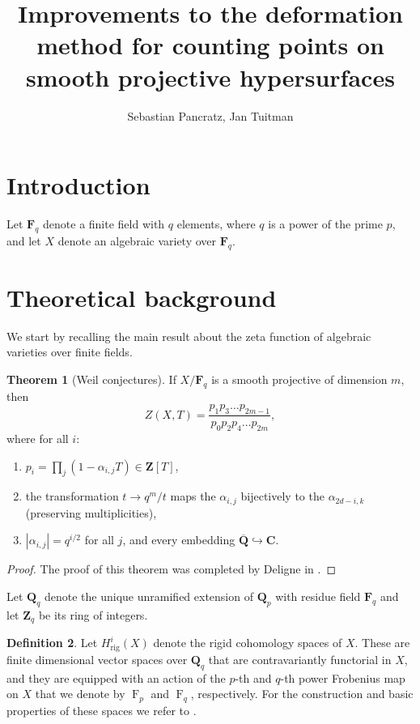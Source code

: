 \documentclass[a4paper,11pt]{article}
\author{Sebastian Pancratz, Jan Tuitman}
\title{Improvements to the deformation method for counting points on smooth projective hypersurfaces}
\numberwithin{equation}{section}
\newcommand{\ZZ}{\mathbf{Z}} %
\newcommand{\QQ}{\mathbf{Q}} %
\newcommand{\CC}{\mathbf{C}} %
\newcommand{\FF}{\mathbf{F}} %
\DeclareMathOperator{\Frob}{F}           %
\providecommand{\Hrig}{H_{\text{rig}}}  %
\theoremstyle{definition}
\newtheorem{thm}{Theorem}[section]
\newtheorem{defn}[thm]{Definition}
\begin{document}
\maketitle

\tableofcontents


\section{Introduction}
\label{sec:Introduction}

Let $\FF_q$ denote a finite field with $q$ elements, where $q$ is a power of the prime $p$, 
and let $X$ denote an algebraic variety over $\FF_q$.

\section{Theoretical background}
\label{sec:Background}

We start by recalling the main result about the zeta function of algebraic
varieties over finite fields.

\begin{thm}[Weil conjectures] If $X/\FF_q$ is a smooth projective of dimension $m$, 
then \label{thm:weildeligne}
\[
Z(X,T)=\frac{p_1 p_3 \ldots p_{2m-1}}{p_0 p_2 p_4 \ldots p_{2m}},
\]
where for all $i$:
\begin{enumerate}
\item $p_i = \prod_j (1-\alpha_{i,j}T) \in \ZZ[T]$,
\item the transformation $t \rightarrow q^m/t$ maps the $\alpha_{i,j}$ bijectively to 
      the $\alpha_{2d-i,k}$ (preserving multiplicities),
\item $|\alpha_{i,j}| = q^{i/2}$ for all $j$, and every embedding $\overline{\QQ} \hookrightarrow \CC$. 
\end{enumerate}
\end{thm}

\begin{proof}
The proof of this theorem was completed by Deligne in \cite{Deligne1974}.
\end{proof}

Let $\QQ_q$ denote the unique unramified extension of $\QQ_p$ with residue field $\FF_q$ and let
$\ZZ_q$ be its ring of integers.

\begin{defn}
Let $\Hrig^{i}(X)$ denote the rigid
cohomology spaces of $X$. These are finite dimensional vector spaces over $\QQ_q$ 
that are contravariantly functorial in $X$, and they are equipped with an action of 
the $p$-th and $q$-th power Frobenius map on $X$ that we denote by $\Frob_p$ 
and $\Frob_q$, respectively. For the construction and basic properties of these spaces we 
refer to \cite{Berthelot1986}.
\end{defn}
\end{document}
